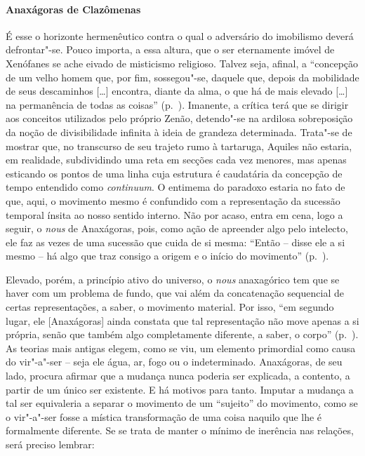 \paragraph{Anaxágoras de Clazômenas} É esse o horizonte hermenêutico contra o 
qual o adversário do imobilismo deverá defrontar"-se. Pouco importa, a essa altura, que o ser
eternamente imóvel de Xenófanes se ache eivado de misticismo religioso.
Talvez seja, afinal, a ``concepção de um velho homem que,
por fim, sossegou"-se, daquele que, depois da mobilidade de seus
descaminhos [\ldots] encontra, diante da alma, o que há de mais elevado
[\ldots] na permanência de todas as coisas'' (p.~\pageref{velhohomem}). 
Imanente, a crítica terá que se dirigir aos conceitos
utilizados pelo próprio Zenão, detendo"-se na ardilosa sobreposição da
noção de divisibilidade infinita à ideia de grandeza determinada.
Trata"-se de mostrar que, no transcurso de seu trajeto rumo à tartaruga,
Aquiles não estaria, em realidade, subdividindo uma reta em secções
cada vez menores, mas apenas esticando os pontos de uma linha cuja
estrutura é caudatária da concepção de tempo entendido como
\textit{continuum}. O entimema do paradoxo estaria no fato de que,
aqui, o movimento mesmo é confundido com a representação da sucessão
temporal ínsita ao nosso sentido interno. Não por acaso, entra em cena,
logo a seguir, o \textit{nous} de Anaxágoras, pois, como ação de
apreender algo pelo intelecto, ele faz as vezes de uma sucessão que
cuida de si mesma: ``Então -- disse ele a si mesmo -- há
algo que traz consigo a origem e o início do
movimento'' (p.~\pageref{aorigemeoinicio}).

Elevado, porém, a princípio ativo do universo, o \textit{nous} 
anaxagórico tem que se haver com um problema de fundo, que vai além da
concatenação sequencial de certas representações, a saber, o movimento
material. Por isso, ``em segundo lugar, ele [Anaxágoras]
ainda constata que tal representação não move apenas a si própria,
senão que também algo completamente diferente, a saber, o
corpo'' (p.~\pageref{asipropria}). As teorias mais
antigas elegem, como se viu, um elemento primordial como causa do
vir"-a"-ser -- seja ele água, ar, fogo ou o indeterminado. Anaxágoras, de
seu lado, procura afirmar que a mudança nunca poderia ser explicada, a
contento, a partir de um único ser existente. E há motivos para tanto.
Imputar a mudança a tal ser equivaleria a separar o movimento de um
``sujeito'' do movimento, como se o vir"-a"-ser
fosse a mística transformação de uma coisa naquilo que lhe é
formalmente diferente. Se se trata de manter o mínimo de inerência nas
relações, será preciso lembrar: 


